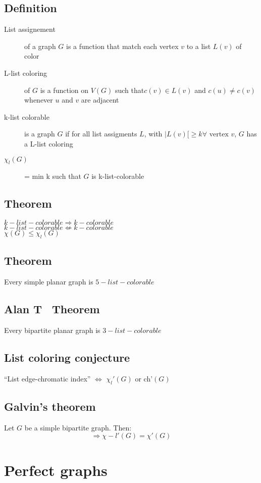         \subsection{Definition}
            \begin{description}
                \item[List assignement] of a graph $G$ is a function that match each vertex $v$ to a list $L(v)$ of color
                \item[L-list coloring] of $G$ is a function on $V(G)$ such that$c(v)\in L(v)$ and $c(u)\neq c(v)$ whenever $u$ and $v$ are adjacent
                \item[k-list colorable] is a graph $G$ if for all list assigments $L$, with $|L(v)[\geq k \forall \text{ vertex }v$, $G$ has a L-list coloring
                \item[$\chi_l(G)$] = min k such that $G$ is k-list-colorable
            \end{description}
        \subsection{Theorem}
                $k-list-colorable \Rightarrow k-colorable$\\
                $k-list-colorable \not\Leftarrow k-colorable$\\
                $\chi(G)\leq\chi_l(G)$
        \subsection{Theorem}
            Every simple planar graph is $5-list-colorable$
        \subsection{Alan T~ Theorem}
            Every bipartite planar graph is $3-list-colorable$
        \subsection{List coloring conjecture}
            ``List edge-chromatic index'' $\Leftrightarrow$ $\chi_l'(G)$ or ch'$(G)$
        \subsection{Galvin's theorem}
            Let $G$ be a simple bipartite graph. Then:
            \[
                \Rightarrow \chi-l'(G)=\chi'(G)
            \]
    \section{Perfect graphs}
